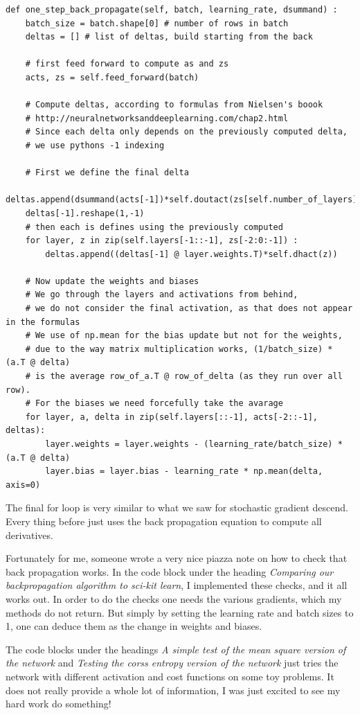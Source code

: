\documentclass[parskip=half]{scrartcl}
\theoremstyle{definition}
\theoremstyle{remark}
\begin{document}
\begin{verbatim}
def one_step_back_propagate(self, batch, learning_rate, dsummand) :
	batch_size = batch.shape[0] # number of rows in batch
	deltas = [] # list of deltas, build starting from the back
        
	# first feed forward to compute as and zs
	acts, zs = self.feed_forward(batch)

	# Compute deltas, according to formulas from Nielsen's boook
	# http://neuralnetworksanddeeplearning.com/chap2.html
	# Since each delta only depends on the previously computed delta, 
	# we use pythons -1 indexing
        
	# First we define the final delta 
	deltas.append(dsummand(acts[-1])*self.doutact(zs[self.number_of_layers]))
	deltas[-1].reshape(1,-1)
	# then each is defines using the previously computed 
	for layer, z in zip(self.layers[-1::-1], zs[-2:0:-1]) :
    	deltas.append((deltas[-1] @ layer.weights.T)*self.dhact(z))
                        
	# Now update the weights and biases
	# We go through the layers and activations from behind, 
	# we do not consider the final activation, as that does not appear in the formulas 
	# We use of np.mean for the bias update but not for the weights, 
	# due to the way matrix multiplication works, (1/batch_size) * (a.T @ delta)
	# is the average row_of_a.T @ row_of_delta (as they run over all row).
	# For the biases we need forcefully take the avarage
	for layer, a, delta in zip(self.layers[::-1], acts[-2::-1], deltas):
    	layer.weights = layer.weights - (learning_rate/batch_size) * (a.T @ delta)
	    layer.bias = layer.bias - learning_rate * np.mean(delta, axis=0)
\end{verbatim}  

The final for loop is very similar to what we saw for stochastic gradient descend. 
Every thing before just uses the back propagation equation to compute all derivatives. 

Fortunately for me, someone wrote a very nice piazza note on how to check that back propagation works. 
In the code block under the heading \emph{Comparing our backpropagation algorithm to sci-kit learn}, I implemented these checks, and it all works out. 
In order to do the checks one needs the various gradients, which my methods do not return. 
But simply by setting the learning rate and batch sizes to 1, one can deduce them as the change in weights and biases.    

The code blocks under the headings \emph{A simple test of the mean square version of the network} and \emph{Testing the corss entropy version of the network} just tries the network with different activation and cost functions on some toy problems. 
It does not really provide a whole lot of information, I was just excited to see my hard work do something!
\end{document}
